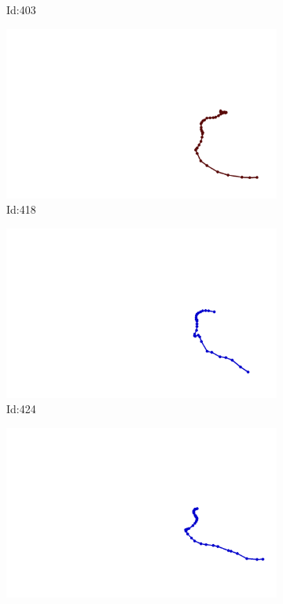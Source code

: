 \documentclass[12pt,twoside]{report}
\begin{document}
\begin{figure}
\begin{subfigure}[b]{0.20\textwidth}
\caption{Id:403}
\end{subfigure}
\begin{subfigure}[b]{0.20\textwidth}
\centering
\includegraphics[width=\textwidth]{../trajectories/418.png}
\caption{Id:418}
\end{subfigure}
\begin{subfigure}[b]{0.20\textwidth}
\centering
\includegraphics[width=\textwidth]{../trajectories/424.png}
\caption{Id:424}
\end{subfigure}
\begin{subfigure}[b]{0.20\textwidth}
\centering
\includegraphics[width=\textwidth]{../trajectories/574.png}

\end{subfigure}
\end{figure}
\end{document}
